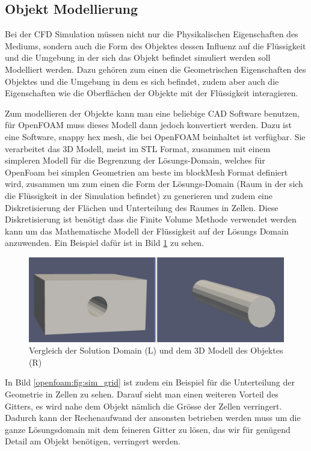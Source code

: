 \subsection{Objekt Modellierung}
Bei der CFD Simulation müssen nicht nur die Physikalischen Eigenschaften des Mediums, sondern auch die Form des Objektes dessen Influenz auf die Flüssigkeit und die Umgebung in der sich das Objekt befindet simuliert werden soll Modelliert werden.
Dazu gehören zum einen die Geometrischen Eigenschaften des Objektes und die Umgebung in dem es sich befindet, zudem aber auch die Eigenschaften wie die Oberflächen der Objekte mit der Flüssigkeit interagieren.

Zum modellieren der Objekte kann man eine beliebige CAD Software benutzen, für OpenFOAM muss dieses Modell dann jedoch konvertiert werden.
Dazu ist eine Software, snappy hex  mesh, die bei OpenFOAM beinhaltet ist verfügbar.
Sie verarbeitet das 3D Modell, meist im STL Format, zusammen mit einem simpleren Modell für die Begrenzung der Lösungs-Domain, welches für OpenFoam bei simplen Geometrien am beste im blockMesh Format definiert wird, zusammen um zum einen die Form der Lösungs-Domain (Raum in der sich die Flüssigkeit in der Simulation befindet) zu generieren und zudem eine Diskretisierung der Flächen und Unterteilung des Raumes in Zellen.
Diese Diskretisierung ist benötigt dass die Finite Volume Methode verwendet werden kann um das Mathematische Modell der Flüssigkeit auf der Lösungs Domain anzuwenden.
Ein Beispiel dafür ist in Bild \ref{openfoam:fig:SD_Modell_vergleich} zu sehen.
\begin{figure}[h]
	\centering
	\includegraphics[scale=0.1]{papers/openfoam/Bilder/vergleich_solution_domain_object.png}
	\caption{Vergleich der Solution Domain (L) und dem 3D Modell des Objektes (R)}
	\label{openfoam:fig:SD_Modell_vergleich}
\end{figure}

In Bild \ref{openfoam:fig:sim_grid} ist zudem ein Beispiel für die Unterteilung der Geometrie in Zellen zu sehen.
Darauf sieht man einen weiteren Vorteil des Gitters, es wird nahe dem Objekt nämlich die Grösse der Zellen verringert.
Dadurch kann der Rechenaufwand der ansonsten betrieben werden muss um die ganze Lösungsdomain mit dem feineren Gitter zu lösen, das wir für genügend Detail am Objekt benötigen, verringert werden.

